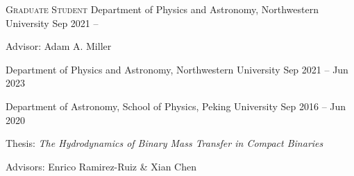 


\begin{cventries}



\cvsimpentry
{{\scshape Graduate Student}} %
{Department of Physics and Astronomy, Northwestern University} %
{Sep 2021 -- } %
{ \begin{cvitems}
	\item {Advisor: Adam A. Miller}
\end{cvitems}
}

\cvsimpentry
{} %
{Department of Physics and Astronomy, Northwestern University} %
{Sep 2021 -- Jun 2023} %
{}

\cvsimpentry
{} %
{Department of Astronomy, School of Physics, Peking University} %
{Sep 2016 -- Jun 2020} %
{ %
	\begin{cvitems}
		\item {Thesis: \textit{The Hydrodynamics of Binary Mass Transfer in Compact Binaries}}
		\item {Advisors: Enrico Ramirez-Ruiz \& Xian Chen}
	\end{cvitems}
}

\end{cventries}